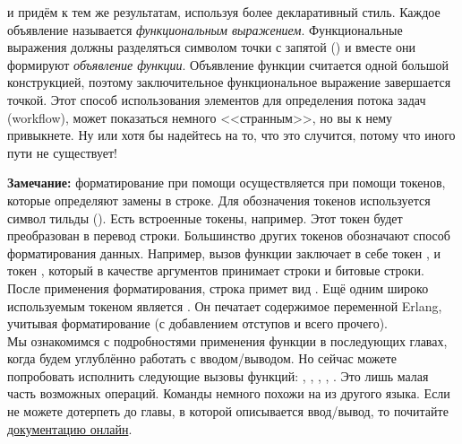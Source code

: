 и придём к тем же результатам, используя более декларативный стиль.
Каждое объявление  называется \emph{функциональным выражением}.
Функциональные выражения должны разделяться символом точки с запятой (\ops{;}) и вместе они формируют \emph{объявление функции}.
Объявление функции считается одной большой конструкцией, поэтому заключительное функциональное выражение завершается точкой.
Этот способ использования элементов для определения потока задач (workflow), может показаться немного <<странным>>, но вы к нему привыкнете.
Ну или хотя бы надейтесь на то, что это случится, потому что иного пути не существует!\\
\colorbox{lgray}
{
    \begin{minipage}{1\linewidth}
        \textbf{Замечание:} форматирование при помощи  осуществляется при помощи токенов, которые определяют замены в строке.
        Для обозначения токенов используется символ тильды (\ops{\strut\mytilde}).
        Есть встроенные токены, например.
        Этот токен будет преобразован в перевод строки.
        Большинство других токенов обозначают способ форматирования данных.
        Например, вызов функции  заключает в себе токен , и токен , который в качестве аргументов принимает строки и битовые строки.
        После применения форматирования, строка примет вид .
        Ещё одним широко используемым токеном является .
        Он печатает содержимое переменной Erlang, учитывая форматирование (с добавлением отступов и всего прочего).\\ 
        Мы ознакомимся с подробностями применения функции  в последующих главах, когда будем углублённо работать с вводом/выводом.
        Но сейчас можете попробовать исполнить следующие вызовы функций: , , , , .
        Это лишь малая часть возможных операций.
        Команды немного похожи на  из другого языка.
        Если не можете дотерпеть до главы, в которой описывается ввод/вывод, то почитайте \href{http://erlang.org/doc/man/io.html\#format-3}{документацию онлайн}.
    \end{minipage}
}

